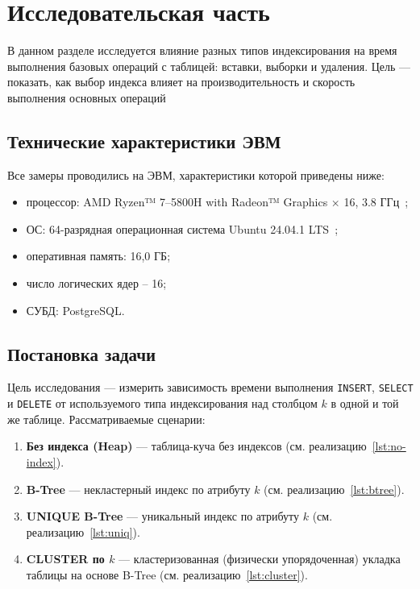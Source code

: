 \chapter{Исследовательская часть}

В данном разделе исследуется влияние разных типов индексирования на время выполнения базовых операций с таблицей:
вставки, выборки и удаления. Цель --- показать, как выбор индекса влияет на производительность и скорость выполнения
основных операций

\section{Технические характеристики ЭВМ}

Все замеры проводились на ЭВМ, характеристики которой приведены
ниже:

\begin{itemize}
    \item процессор: AMD Ryzen™ 7--5800H with Radeon™ Graphics × 16, 3.8 ГГц~\cite{radeon};
    \item ОС: 64-разрядная операционная система Ubuntu 24.04.1 LTS~\cite{ubuntu};
    \item оперативная память: 16,0 ГБ;
    \item число логических ядер -- 16;
    \item СУБД: PostgreSQL.
\end{itemize}

\section{Постановка задачи}

Цель исследования — измерить зависимость времени выполнения \texttt{INSERT}, \texttt{SELECT} и \texttt{DELETE} от
используемого типа индексирования над столбцом \(k\) в одной и той же таблице.
Рассматриваемые сценарии:

\begin{enumerate}[label=\arabic*.]
  \item \textbf{Без индекса (Heap)} — таблица-куча без индексов
        (см. реализацию~\ref{lst:no-index}).
  \item \textbf{B-Tree} — некластерный индекс по атрибуту \(k\)
        (см. реализацию~\ref{lst:btree}).
  \item \textbf{UNIQUE B-Tree} — уникальный индекс по атрибуту \(k\)
        (см. реализацию~\ref{lst:uniq}).
  \item \textbf{CLUSTER по \(k\)} — кластеризованная (физически упорядоченная) укладка таблицы на основе B-Tree
        (см. реализацию~\ref{lst:cluster}).
\end{enumerate}

